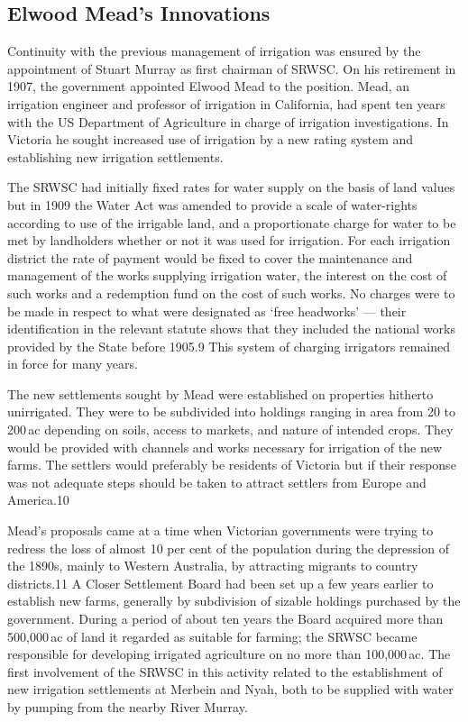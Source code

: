 \subsection{Elwood Mead's Innovations}

Continuity with the previous management of irrigation was ensured by
the appointment of Stuart Murray as first chairman of SRWSC. On his
retirement in 1907, the government appointed Elwood Mead to the
position.  Mead, an irrigation engineer and professor of irrigation in
California, had spent ten years with the US Department of Agriculture
in charge of irrigation investigations.  In Victoria he sought
increased use of irrigation by a new rating system and establishing
new irrigation settlements.

The SRWSC had initially fixed rates for water supply on the basis of
land values but in 1909 the Water Act was amended to provide a scale
of water-rights according to use of the irrigable land, and a
proportionate charge for water to be met by landholders whether or not
it was used for irrigation.  For each irrigation district the rate of
payment would be fixed to cover the maintenance and management of the
works supplying irrigation water, the interest on the cost of such
works and a redemption fund on the cost of such works.  No charges
were to be made in respect to what were designated as `free headworks'
--- their identification in the relevant statute shows that they
included the national works provided by the State before 1905.9 This
system of charging irrigators remained in force for many years.

The new settlements sought by Mead were established on properties
hitherto unirrigated. They were to be subdivided into holdings ranging
in area from 20 to 200\,ac depending on soils, access to markets, and
nature of intended crops.  They would be provided with channels and
works necessary for irrigation of the new farms.  The settlers would
preferably be residents of Victoria but if their response was not
adequate steps should be taken to attract settlers from Europe and
America.10

Mead's proposals came at a time when Victorian governments were trying
to redress the loss of almost 10 per cent of the population during the
depression of the 1890s, mainly to Western Australia, by attracting
migrants to country districts.11 A Closer Settlement Board had been
set up a few years earlier to establish new farms, generally by
subdivision of sizable holdings purchased by the government.  During a
period of about ten years the Board acquired more than 500,000\,ac of
land it regarded as suitable for farming; the SRWSC became responsible
for developing irrigated agriculture on no more than 100,000\,ac.  The
first involvement of the SRWSC in this activity related to the
establishment of new irrigation settlements at Merbein and Nyah, both
to be supplied with water by pumping from the nearby River Murray.


